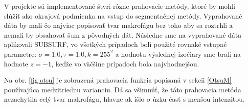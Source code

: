 \documentclass[a4paper,12pt,twoside]{article}%
\begin{document}
V projekte sú implementované štyri rôzne prahovacie metódy, ktoré by mohli slúžiť ako okrajová podmienka na vstup do segmentačnej metódy. Vyprahované dáta by mali čo najviac popisovať tvar makrofágu bez toho aby sa roztrhli a nemali by obsahovať šum z pôvodných dát. Následne sme na vyprahované dáta aplikovali SUBSURF, vo všetkých prípadoch boli použité rovnaké vstupné parametre: $\sigma = 1.0, \tau = 1.0, k = 255^2$ a hodnotu výslednej izočiary sme brali na hodnote $z = -1$, keďže vo väčšine prípadoch bola najvhodnejšou.

Na obr. \ref{fig:otsu} je zobrazená prahovacia funkcia popísaná v sekcii \ref{OtsuM} používajúca medzitriednu varianciu. Dá sa všimnúť, že táto prahovacia metóda nezachytila celý tvar makrofágu, hlavne ak išlo o úzku časť s menšou intenzitou.

\begin{figure}[H]  
    \hspace{5px}
     \subfloat[cropT7] 

\end{figure}
\end{document}
